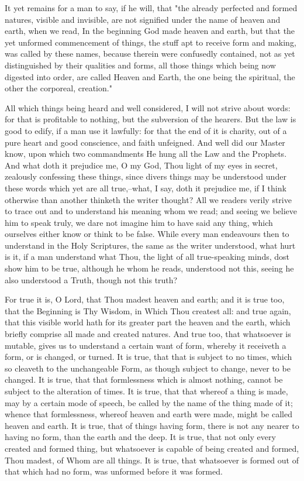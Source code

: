 \documentclass[b5paper,openright,12pt,twoside]{book}
\begin{document}
It yet remains for a man to say, if he will, that "the already perfected
and formed natures, visible and invisible, are not signified under the
name of heaven and earth, when we read, In the beginning God made heaven
and earth, but that the yet unformed commencement of things, the stuff
apt to receive form and making, was called by these names, because
therein were confusedly contained, not as yet distinguished by their
qualities and forms, all those things which being now digested into
order, are called Heaven and Earth, the one being the spiritual, the
other the corporeal, creation."

All which things being heard and well considered, I will not strive
about words: for that is profitable to nothing, but the subversion of
the hearers. But the law is good to edify, if a man use it lawfully: for
that the end of it is charity, out of a pure heart and good conscience,
and faith unfeigned. And well did our Master know, upon which two
commandments He hung all the Law and the Prophets. And what doth it
prejudice me, O my God, Thou light of my eyes in secret, zealously
confessing these things, since divers things may be understood under
these words which yet are all true,--what, I say, doth it prejudice me,
if I think otherwise than another thinketh the writer thought? All we
readers verily strive to trace out and to understand his meaning whom we
read; and seeing we believe him to speak truly, we dare not imagine
him to have said any thing, which ourselves either know or think to
be false. While every man endeavours then to understand in the Holy
Scriptures, the same as the writer understood, what hurt is it, if a man
understand what Thou, the light of all true-speaking minds, dost show
him to be true, although he whom he reads, understood not this, seeing
he also understood a Truth, though not this truth?

For true it is, O Lord, that Thou madest heaven and earth; and it is
true too, that the Beginning is Thy Wisdom, in Which Thou createst all:
and true again, that this visible world hath for its greater part
the heaven and the earth, which briefly comprise all made and created
natures. And true too, that whatsoever is mutable, gives us to
understand a certain want of form, whereby it receiveth a form, or is
changed, or turned. It is true, that that is subject to no times, which
so cleaveth to the unchangeable Form, as though subject to change,
never to be changed. It is true, that that formlessness which is almost
nothing, cannot be subject to the alteration of times. It is true, that
that whereof a thing is made, may by a certain mode of speech, be called
by the name of the thing made of it; whence that formlessness, whereof
heaven and earth were made, might be called heaven and earth. It is
true, that of things having form, there is not any nearer to having
no form, than the earth and the deep. It is true, that not only every
created and formed thing, but whatsoever is capable of being created and
formed, Thou madest, of Whom are all things. It is true, that whatsoever
is formed out of that which had no form, was unformed before it was
formed.
\end{document}
